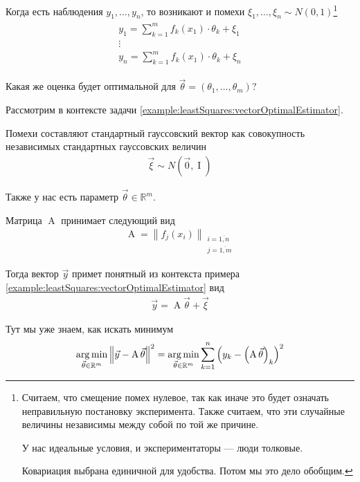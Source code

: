 Когда есть наблюдения $y_1, \dots, y_n$, то возникают и помехи
$\xi_1, \dots, \xi_n \sim N\left( 0, 1 \right)$\footnote{Считаем, что смещение
помех нулевое, так как иначе это будет означать неправильную постановку
эксперимента. Также считаем, что эти случайные величины независимы между собой
по той же причине.

У нас идеальные условия, и экспериментаторы --- люди толковые.

Ковариация выбрана единичной для удобства. Потом мы это дело обобщим.}
\begin{align*}
    \begin{array}{c}
        y_1 = \sum_{k=1}^{m} f_k\left( x_1 \right) \cdot \theta_k + \xi_1 \\
        \vdots \\
        y_n = \sum_{k=1}^{m} f_k\left( x_1 \right) \cdot \theta_k + \xi_n
    \end{array}
\end{align*}

Какая же оценка будет оптимальной для
$\vec{\theta} = \left( \theta_1, \dots, \theta_m \right)$?

Рассмотрим в контексте задачи \ref{example:leastSquares:vectorOptimalEstimator}.

\begin{example}
    Помехи составляют стандартный гауссовский вектор как совокупность
    независимых стандартных гауссовских величин
    \begin{align*}
        \vec{\xi} \sim N\left( \vec{0}, \operatorname{I} \right)
    \end{align*}

    Также у нас есть параметр $\vec{\theta} \in \mathbb{R}^m$.

    Матрица $\operatorname{A}$ принимает следующий вид
    \begin{align*}
        \operatorname{A} = \left\| f_j\left( x_i \right) \right\|_{
            \substack{i = \overline{1, n} \\ j = \overline{1, m}}}
    \end{align*}

    Тогда вектор $\vec{y}$ примет понятный из контекста примера
    \ref{example:leastSquares:vectorOptimalEstimator} вид
    \begin{align*}
        \vec{y} = \operatorname{A} \vec{\theta} + \vec{\xi}
    \end{align*}

    Тут мы уже знаем, как искать минимум
    \begin{align*}
        \argminof{\left\| \vec{y} - \operatorname{A} \vec{\theta} \right\|^2}{
            \vec{\theta} \in \mathbb{R}^m}
        = \argminof{\sum_{k=1}^{n} \left( y_k
                - \left( \operatorname{A} \vec{\theta} \right)_k \right)^2}{
            \vec{\theta} \in \mathbb{R}^m}
    \end{align*}
\end{example}


